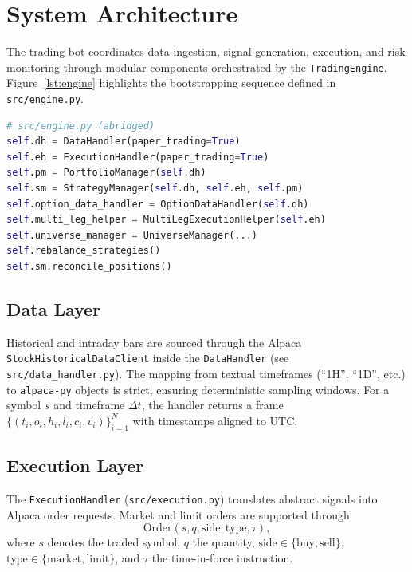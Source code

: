 \chapter{System Architecture}

The trading bot coordinates data ingestion, signal generation, execution, and risk monitoring through modular components orchestrated by the \texttt{TradingEngine}. Figure~\ref{lst:engine} highlights the bootstrapping sequence defined in \texttt{src/engine.py}.

\begin{lstlisting}[language=Python, firstnumber=1,label={lst:engine},caption={Trading engine initialisation excerpt}]
# src/engine.py (abridged)
self.dh = DataHandler(paper_trading=True)
self.eh = ExecutionHandler(paper_trading=True)
self.pm = PortfolioManager(self.dh)
self.sm = StrategyManager(self.dh, self.eh, self.pm)
self.option_data_handler = OptionDataHandler(self.dh)
self.multi_leg_helper = MultiLegExecutionHelper(self.eh)
self.universe_manager = UniverseManager(...)
self.rebalance_strategies()
self.sm.reconcile_positions()
\end{lstlisting}

\section{Data Layer}
Historical and intraday bars are sourced through the Alpaca \texttt{StockHistoricalDataClient} inside the \texttt{DataHandler} (see \texttt{src/data_handler.py}). The mapping from textual timeframes (``1H'', ``1D'', etc.) to \texttt{alpaca-py} objects is strict, ensuring deterministic sampling windows. For a symbol $s$ and timeframe $\Delta t$, the handler returns a frame $\{(t_i, o_i, h_i, l_i, c_i, v_i)\}_{i=1}^N$ with timestamps aligned to UTC.

\section{Execution Layer}
The \texttt{ExecutionHandler} (\texttt{src/execution.py}) translates abstract signals into Alpaca order requests. Market and limit orders are supported through
\begin{equation}
\text{Order}(s, q, \text{side}, \text{type}, \tau),
\end{equation}
where $s$ denotes the traded symbol, $q$ the quantity, $\text{side} \in \{\text{buy}, \text{sell}\}$, $\text{type} \in \{\text{market}, \text{limit}\}$, and $\tau$ the time-in-force instruction.


